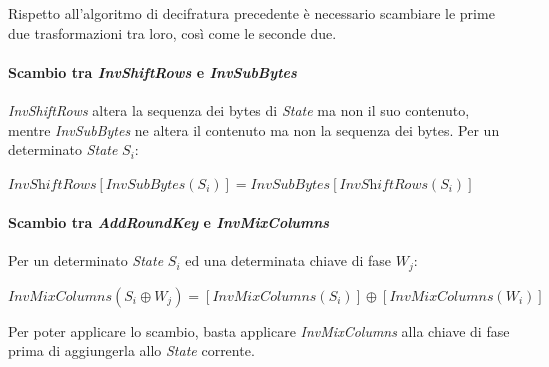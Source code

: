 \documentclass[a4paper,11pt]{article}
\begin{document}
Rispetto all'algoritmo di decifratura precedente è necessario scambiare le prime due trasformazioni tra loro, così come le seconde due.
\paragraph{Scambio tra \textit{InvShiftRows} e \textit{InvSubBytes}} \textit{InvShiftRows} altera la sequenza dei bytes di \textit{State} ma non il suo contenuto, mentre \textit{InvSubBytes} ne altera il contenuto ma non la sequenza dei bytes. Per un determinato \textit{State} $S_i$: 
\begin{center}
    $\textit{InvShiftRows}[\textit{InvSubBytes}(S_i)] = \textit{InvSubBytes}[\textit{InvShiftRows}(S_i)]$
\end{center} 
\paragraph{Scambio tra \textit{AddRoundKey} e \textit{InvMixColumns}} Per un determinato \textit{State} $S_i$ ed una determinata chiave di fase $W_j$:
\begin{center}
    $\textit{InvMixColumns}(S_i \oplus W_j) = [\textit{InvMixColumns}(S_i)] \oplus [\textit{InvMixColumns}(W_i)]$
\end{center}

Per poter applicare lo scambio, basta applicare \textit{InvMixColumns} alla chiave di fase prima di aggiungerla allo \textit{State} corrente.
\newpage
\ %
\end{document}
